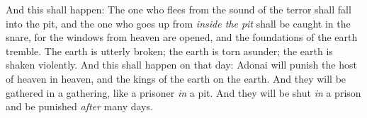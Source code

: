 \begin{biblechapter}
\verse And this shall happen:
\verse The one who flees from the sound of the terror shall fall into the pit, 
and the one who goes up from \textit{inside the pit} shall be caught in the snare, 
for the windows from heaven are opened, 
and the foundations of the earth tremble.
\verse The earth is utterly broken; 
the earth is torn asunder; 
the earth is shaken violently.
\verse And this shall happen on that day:
\verse Adonai will punish the host of heaven in heaven, 
and the kings of the earth on the earth.
\verse And they will be gathered in a gathering, like a prisoner \textit{in} a pit. 
And they will be shut \textit{in} a prison and be punished \textit{after} many days.
\end{biblechapter}

